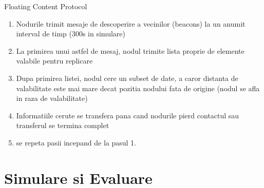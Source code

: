 \documentclass{beamer}
\begin{document}
\begin{frame}{Floating Content Protocol}
	\begin{enumerate}
	  \item Nodurile trimit mesaje de descoperire a vecinilor (beacons) la un
	  anumit interval de timp (300s in simulare)
	  \item La primirea unui astfel de mesaj, nodul trimite lista proprie de
	  elemente valabile pentru replicare
	  \item Dupa primirea listei, nodul cere un subset de date, a caror distanta de
	  valabilitate este mai mare decat pozitia nodului fata de origine (nodul se
	  afla in raza de valabilitate)
	  \item Informatiile cerute se transfera pana cand nodurile pierd contactul sau
	  transferul se termina complet
	  \item se repeta pasii incepand de la pasul 1.
	\end{enumerate}
\end{frame}

\section{Simulare si Evaluare}
\end{document}
